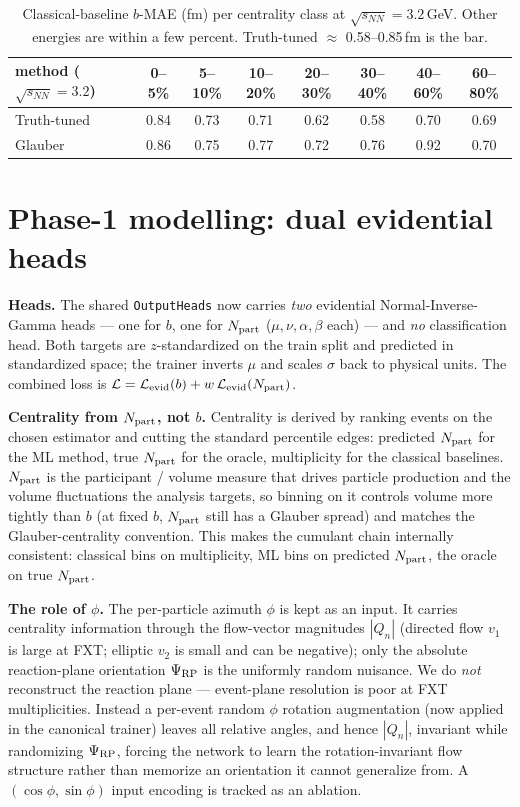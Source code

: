 \documentclass[11pt]{article}
\newcommand{\snn}{\sqrt{s_{NN}}}
\newcommand{\code}[1]{\texttt{#1}}
\begin{document}
\begin{table}[h]
\centering
\begin{tabular}{lccccccc}
\toprule
method ($\snn=3.2$) & 0--5\% & 5--10\% & 10--20\% & 20--30\% & 30--40\% & 40--60\% & 60--80\% \\
\midrule
Truth-tuned & 0.84 & 0.73 & 0.71 & 0.62 & 0.58 & 0.70 & 0.69 \\
Glauber     & 0.86 & 0.75 & 0.77 & 0.72 & 0.76 & 0.92 & 0.70 \\
\bottomrule
\end{tabular}
\caption{Classical-baseline $b$-MAE (fm) per centrality class at $\snn=3.2$\,GeV.
Other energies are within a few percent. Truth-tuned $\approx$ 0.58--0.85\,fm is
the bar.}
\label{tab:bar}
\end{table}

\section{Phase-1 modelling: dual evidential heads}
\textbf{Heads.} The shared \code{OutputHeads} now carries \emph{two} evidential
Normal-Inverse-Gamma heads --- one for $b$, one for $N_{\rm part}$
($\mu,\nu,\alpha,\beta$ each) --- and \emph{no} classification head. Both targets
are $z$-standardized on the train split and predicted in standardized space; the
trainer inverts $\mu$ and scales $\sigma$ back to physical units. The combined
loss is $\mathcal{L} = \mathcal{L}_{\rm evid}(b) + w\,\mathcal{L}_{\rm
evid}(N_{\rm part})$.

\textbf{Centrality from $N_{\rm part}$, not $b$.} Centrality is derived by ranking
events on the chosen estimator and cutting the standard percentile edges:
predicted $N_{\rm part}$ for the ML method, true $N_{\rm part}$ for the oracle,
multiplicity for the classical baselines. $N_{\rm part}$ is the participant /
volume measure that drives particle production and the volume fluctuations the
analysis targets, so binning on it controls volume more tightly than $b$ (at fixed
$b$, $N_{\rm part}$ still has a Glauber spread) and matches the Glauber-centrality
convention. This makes the cumulant chain internally consistent: classical bins on
multiplicity, ML bins on predicted $N_{\rm part}$, the oracle on true
$N_{\rm part}$.

\textbf{The role of $\phi$.} The per-particle azimuth $\phi$ is kept as an input.
It carries centrality information through the flow-vector magnitudes $|Q_n|$
(directed flow $v_1$ is large at FXT; elliptic $v_2$ is small and can be negative);
only the absolute reaction-plane orientation $\Psi_{\rm RP}$ is the uniformly
random nuisance. We do \emph{not} reconstruct the reaction plane --- event-plane
resolution is poor at FXT multiplicities. Instead a per-event random $\phi$
rotation augmentation (now applied in the canonical trainer) leaves all relative
angles, and hence $|Q_n|$, invariant while randomizing $\Psi_{\rm RP}$, forcing
the network to learn the rotation-invariant flow structure rather than memorize an
orientation it cannot generalize from. A $(\cos\phi, \sin\phi)$ input encoding is
tracked as an ablation.
\end{document}
